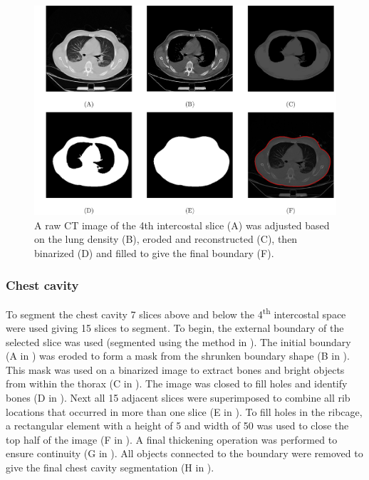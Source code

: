 \begin{figure}
	\centering
	\includegraphics[width=\textwidth]{chapter5-CT_to_mesh/imgs/boundary_seg_methods.pdf}
	\caption[Boundary segmentation methods.]{\label{fig:ext_seg_methods}%
	A raw CT image of the 4th intercostal slice (A) 
	was adjusted based on the lung density (B), 
	eroded and reconstructed (C), then binarized (D) and 
	filled to give the final boundary (F).
	}
\end{figure}

\subsubsection{Chest cavity}
To segment the chest cavity 7 slices above and below the 4\textsuperscript{th}
intercostal space were used giving 15 slices to segment. 
To begin, the external boundary of the selected slice was
used (segmented using the method in ). 
The initial boundary 
(A in )
was eroded to form a mask from the shrunken boundary shape
(B in ).
This mask was used on a binarized image to extract bones and bright objects from
within the thorax 
(C in ).
The image was closed to fill  holes and identify bones
(D in ).
Next all 15 adjacent slices were superimposed to combine all rib locations
that occurred in more than one slice
(E in ).
To fill holes in the ribcage, a rectangular 
element with a height of 5 and width of 50 was used to close 
the top half of the image
(F in ).
A final thickening operation was performed to ensure continuity
(G in ).
All objects connected to the boundary were removed 
to give the final chest cavity segmentation
(H in ).

